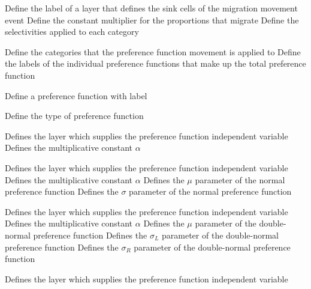  {Define the label of a layer that defines the sink cells of the migration movement event}
 {Define the constant multiplier for the proportions that migrate}
 {Define the selectivities applied to each category}
\par\textbf{}\par
\par\textbf{}\par
{} {Define the categories that the preference function movement is applied to}
 {Define the labels of the individual  preference functions that make up the total preference function}
\par {} {Define a preference function with label}\par
{} {Define the type of preference function}
\par\textbf{}\par
{} {Defines the layer which supplies the preference function independent variable}
 {Defines the multiplicative constant $\alpha$}
\par\textbf{}\par
{} {Defines the layer which supplies the preference function independent variable}
 {Defines the multiplicative constant $\alpha$}
 {Defines the $\mu$ parameter of the normal preference function}
 {Defines the $\sigma$ parameter of the normal preference function}
\par\textbf{}\par
{} {Defines the layer which supplies the preference function independent variable}
 {Defines the multiplicative constant $\alpha$}
 {Defines the $\mu$ parameter of the double-normal preference function}
 {Defines the $\sigma_L$ parameter of the double-normal preference function}
 {Defines the $\sigma_R$ parameter of the double-normal preference function}
\par\textbf{}\par
{} {Defines the layer which supplies the preference function independent variable}
